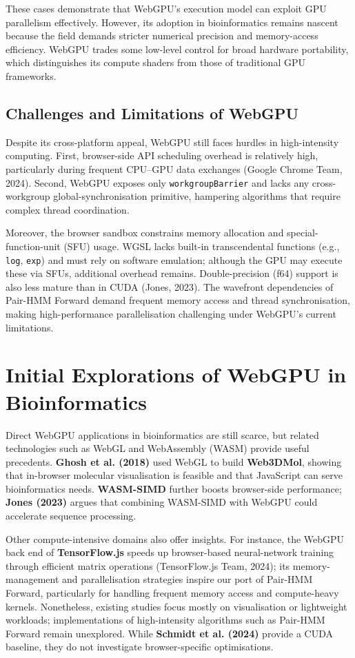 \documentclass[12pt]{report}
\begin{document}
These cases demonstrate that WebGPU’s execution model can exploit GPU parallelism effectively. However, its adoption in bioinformatics remains nascent because the field demands stricter numerical precision and memory-access efficiency. WebGPU trades some low-level control for broad hardware portability, which distinguishes its compute shaders from those of traditional GPU frameworks.

\subsection{Challenges and Limitations of WebGPU}
Despite its cross-platform appeal, WebGPU still faces hurdles in high-intensity computing. First, browser-side API scheduling overhead is relatively high, particularly during frequent CPU–GPU data exchanges (Google Chrome Team, 2024). Second, WebGPU exposes only \texttt{workgroupBarrier} and lacks any cross-workgroup global-synchronisation primitive, hampering algorithms that require complex thread coordination.

Moreover, the browser sandbox constrains memory allocation and special-function-unit (SFU) usage. WGSL lacks built-in transcendental functions (e.g., \texttt{log}, \texttt{exp}) and must rely on software emulation; although the GPU may execute these via SFUs, additional overhead remains. Double-precision (f64) support is also less mature than in CUDA (Jones, 2023). The wavefront dependencies of Pair-HMM Forward demand frequent memory access and thread synchronisation, making high-performance parallelisation challenging under WebGPU’s current limitations.

\section{Initial Explorations of WebGPU in Bioinformatics}
Direct WebGPU applications in bioinformatics are still scarce, but related technologies such as WebGL and WebAssembly (WASM) provide useful precedents. \textbf{Ghosh et al. (2018)} used WebGL to build \textbf{Web3DMol}, showing that in-browser molecular visualisation is feasible and that JavaScript can serve bioinformatics needs. \textbf{WASM-SIMD} further boosts browser-side performance; \textbf{Jones (2023)} argues that combining WASM-SIMD with WebGPU could accelerate sequence processing.

Other compute-intensive domains also offer insights. For instance, the WebGPU back end of \textbf{TensorFlow.js} speeds up browser-based neural-network training through efficient matrix operations (TensorFlow.js Team, 2024); its memory-management and parallelisation strategies inspire our port of Pair-HMM Forward, particularly for handling frequent memory access and compute-heavy kernels. Nonetheless, existing studies focus mostly on visualisation or lightweight workloads; implementations of high-intensity algorithms such as Pair-HMM Forward remain unexplored. While \textbf{Schmidt et al. (2024)} provide a CUDA baseline, they do not investigate browser-specific optimisations.
\end{document}

